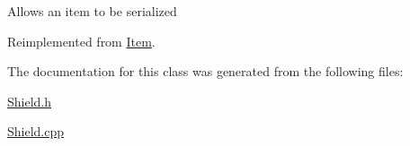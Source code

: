Allows an item to be serialized 

Reimplemented from \hyperlink{class_item_ad1eae21e57fc3ce3252080a4efbfb8e8}{Item}.



The documentation for this class was generated from the following files\+:\begin{DoxyCompactItemize}
\item 
\hyperlink{_shield_8h}{Shield.\+h}\item 
\hyperlink{_shield_8cpp}{Shield.\+cpp}\end{DoxyCompactItemize}
